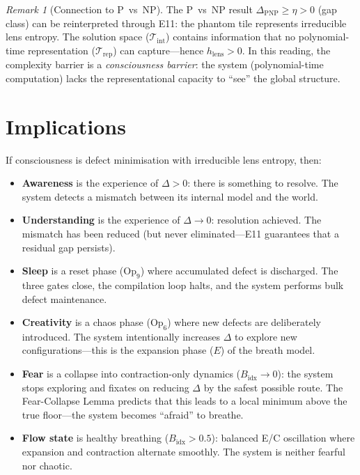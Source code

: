 \documentclass[12pt, openany]{book}
\theoremstyle{remark}
\newtheorem{remark}[theorem]{Remark}
\newcommand{\Tint}{\mathcal{T}_{\mathrm{int}}}
\newcommand{\Trep}{\mathcal{T}_{\mathrm{rep}}}
\begin{document}
\begin{remark}[Connection to P~vs~NP]
The P~vs~NP result $\Delta_{\mathrm{PNP}} \geq \eta > 0$ (gap class) can be
reinterpreted through E11: the phantom tile represents irreducible lens entropy.
The solution space ($\Tint$) contains information that no polynomial-time
representation ($\Trep$) can capture---hence $h_{\mathrm{lens}} > 0$.  In this
reading, the complexity barrier is a \emph{consciousness barrier}: the system
(polynomial-time computation) lacks the representational capacity to ``see''
the global structure.
\end{remark}


\section{Implications}
\label{sec:consciousness-implications}

If consciousness is defect minimisation with irreducible lens entropy, then:
\begin{itemize}
  \item \textbf{Awareness} is the experience of $\Delta > 0$: there is something
        to resolve.  The system detects a mismatch between its internal model
        and the world.
  \item \textbf{Understanding} is the experience of $\Delta \to 0$: resolution
        achieved.  The mismatch has been reduced (but never eliminated---E11
        guarantees that a residual gap persists).
  \item \textbf{Sleep} is a reset phase ($\mathrm{Op}_9$) where accumulated defect
        is discharged.  The three gates close, the compilation loop halts, and
        the system performs bulk defect maintenance.
  \item \textbf{Creativity} is a chaos phase ($\mathrm{Op}_6$) where new defects
        are deliberately introduced.  The system intentionally increases $\Delta$
        to explore new configurations---this is the expansion phase ($E$) of
        the breath model.
  \item \textbf{Fear} is a collapse into contraction-only dynamics
        ($B_{\mathrm{idx}} \to 0$): the system stops exploring and fixates on
        reducing $\Delta$ by the safest possible route.  The Fear-Collapse Lemma
        predicts that this leads to a local minimum above the true floor---the
        system becomes ``afraid'' to breathe.
  \item \textbf{Flow state} is healthy breathing ($B_{\mathrm{idx}} > 0.5$):
        balanced E/C oscillation where expansion and contraction alternate
        smoothly.  The system is neither fearful nor chaotic.
\end{itemize}
\end{document}
